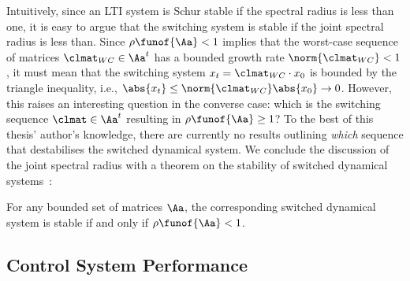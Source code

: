 Intuitively, since an LTI system is Schur stable if the spectral radius is less than one, it is easy to argue that the switching system is stable if the joint spectral radius is less than.
Since $\rho\funof{\Aa} < 1$ implies that the worst-case sequence of matrices $\clmat_{WC} \in \Aa^t$ has a bounded growth rate $\norm{\clmat_{WC}} < 1$, it must mean that the switching system $x_t = \clmat_{WC}\cdot x_0$ is bounded by the triangle inequality, i.e., $\abs{x_t} \leq \norm{\clmat_{WC}}\abs{x_0} \rightarrow 0$.
However, this raises an interesting question in the converse case: which is the switching sequence $\clmat \in \Aa^t$ resulting in $\rho\funof{\Aa} \geq 1$?
To the best of this thesis' author's knowledge, there are currently no results outlining \emph{which} sequence that destabilises the switched dynamical system.
We conclude the discussion of the joint spectral radius with a theorem on the stability of switched dynamical systems~\cite{Jungers:2009}: 
%
\begin{theorem}%
    \label{thm:switching-stability}%
    For any bounded set of matrices $\Aa$, the corresponding switched dynamical system is stable if and only if $\rho\funof{\Aa} < 1$.
\end{theorem}




\subsection{Control System Performance}%
\label{sec:background:performance}%
%


